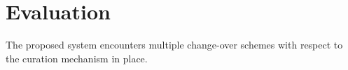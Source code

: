 \documentclass[10pt]{article}
\begin{document}
\pagebreak
\section*{Evaluation}

The proposed system encounters multiple change-over schemes with respect to the curation mechanism in place.\\
\end{document}
